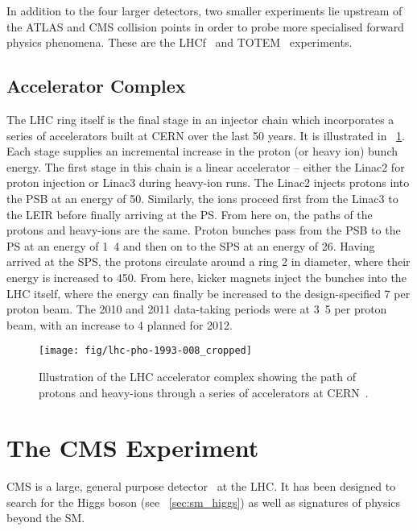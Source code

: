 In addition to the four larger detectors, two smaller experiments lie upstream
of the \ac{ATLAS} and \ac{CMS} collision points in order to probe more
specialised forward physics phenomena. These are the
\ac{LHCf}~\cite{lhcf_proposal} and \ac{TOTEM}~\cite{totem_proposal} experiments.

\subsection{Accelerator Complex}
The \ac{LHC} ring itself is the final stage in an injector chain which
incorporates a series of accelerators built at CERN over the last 50 years. It
is illustrated in \fig~\ref{fig:expt_lhc}. Each stage supplies an incremental
increase in the proton (or heavy ion) bunch energy. The first stage in this
chain is a linear accelerator -- either the Linac2 for proton injection or
Linac3 during heavy-ion runs. The Linac2 injects protons into the \ac{PSB} at an
energy of \unit{50}{\mega\electronvolt}. Similarly, the ions proceed first from
the Linac3 to the \ac{LEIR} before finally arriving at the \ac{PS}. From here
on, the paths of the protons and heavy-ions are the same. Proton bunches pass
from the \ac{PSB} to the \ac{PS} at an energy of \unit{1.4}{\giga\electronvolt}
and then on to the \ac{SPS} at an energy of
\unit{26}{\giga\electronvolt}. Having arrived at the \ac{SPS}, the protons
circulate around a ring \unit{2}{\kilo\metre} in diameter, where their energy is
increased to \unit{450}{\giga\electronvolt}. From here, kicker magnets inject
the bunches into the \ac{LHC} itself, where the energy can finally be increased
to the design-specified \unit{7}{\TeV} per proton beam. The 2010 and 2011
data-taking periods were at \unit{3.5}{\TeV} per proton beam, with an increase
to \unit{4}{\TeV} planned for 2012.

\begin{figure}[h!]
\texttt{[image: fig/lhc-pho-1993-008\_cropped]}
\caption[Illustration of the \acs{LHC} accelerator complex]{Illustration of the
  \ac{LHC} accelerator complex showing the path of protons and heavy-ions
  through a series of accelerators at \ac{CERN}~\cite{lhc_injection}.}
\label{fig:expt_lhc}
\end{figure}

\section{The \acl{CMS} Experiment}
\label{sec:cms}
\ac{CMS} is a large, general purpose detector~\cite{cms_jinst} at the
\ac{LHC}. It has been designed to search for the Higgs boson (see
\sec~\ref{sec:sm_higgs}) as well as signatures of physics beyond the \ac{SM}.

